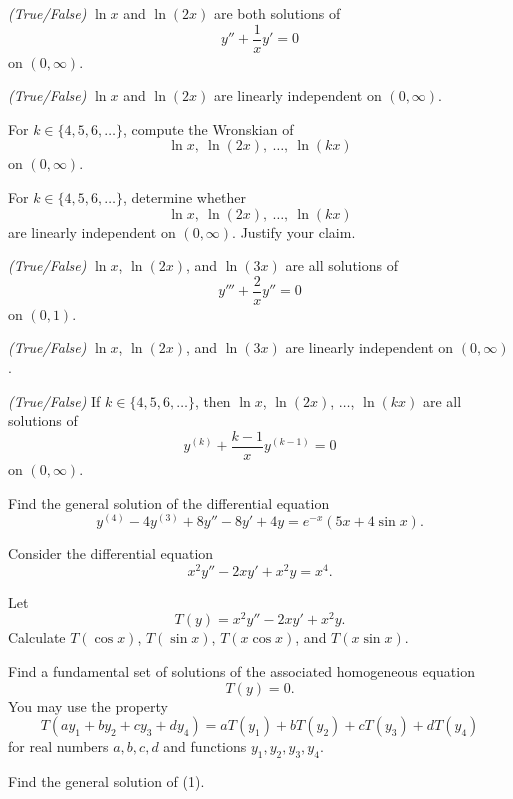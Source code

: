 \documentclass[11pt,oneside]{article}
\begin{document}
\begin{problem}
\begin{problemsubparts}
\item \textit{(True/False)} $\ln x$ and $\ln(2x)$ are both solutions of
\[
y''+\frac1x y'=0
\]
on $(0,\infty)$.
\item \textit{(True/False)} $\ln x$ and $\ln(2x)$ are linearly independent on $(0,\infty)$.
\item For $k\in\{4,5,6,\dots\}$, compute the Wronskian of
\[
\ln x,\ \ln(2x),\ \dots,\ \ln(kx)
\]
on $(0,\infty)$.
\item For $k\in\{4,5,6,\dots\}$, determine whether
\[
\ln x,\ \ln(2x),\ \dots,\ \ln(kx)
\]
are linearly independent on $(0,\infty)$. Justify your claim.
\item \textit{(True/False)} $\ln x$, $\ln(2x)$, and $\ln(3x)$ are all solutions of
\[
y'''+\frac2x y''=0
\]
on $(0,1)$.
\item \textit{(True/False)} $\ln x$, $\ln(2x)$, and $\ln(3x)$ are linearly independent on $(0,\infty)$.
\item \textit{(True/False)} If $k\in\{4,5,6,\dots\}$, then $\ln x$, $\ln(2x)$, $\dots$, $\ln(kx)$ are all solutions of
\[
y^{(k)}+\frac{k-1}{x}y^{(k-1)}=0
\]
on $(0,\infty)$.
\end{problemsubparts}
\end{problem}

\begin{problem}
Find the general solution of the differential equation
\[
y^{(4)}-4y^{(3)}+8y''-8y'+4y=e^{-x}(5x+4\sin x).
\]
\end{problem}

\begin{problem}
Consider the differential equation
\[
x^2y''-2xy'+x^2y=x^4. \tag{1}
\]
\begin{problemsubparts}
\item Let
\[
T(y)=x^2y''-2xy'+x^2y.
\]
Calculate $T(\cos x)$, $T(\sin x)$, $T(x\cos x)$, and $T(x\sin x)$.
\item Find a fundamental set of solutions of the associated homogeneous equation
\[
T(y)=0.
\]
You may use the property
\[
T(ay_1+by_2+cy_3+dy_4)
=aT(y_1)+bT(y_2)+cT(y_3)+dT(y_4)
\]
for real numbers $a,b,c,d$ and functions $y_1,y_2,y_3,y_4$.
\item Find the general solution of (1).
\end{problemsubparts}
\end{problem}
\end{document}
